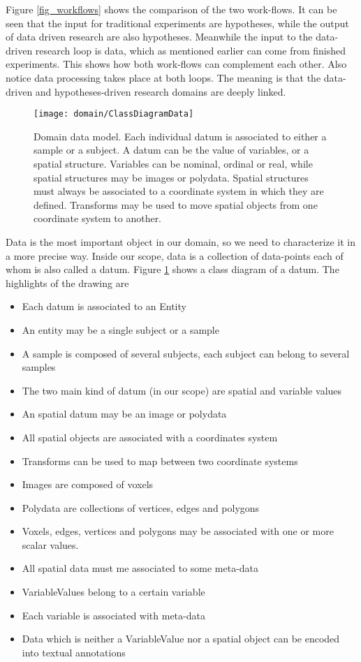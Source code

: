 Figure \ref{fig_workflows} shows the comparison of the two work-flows. It can be seen that the input for traditional experiments are hypotheses, while the output of data driven research are also hypotheses. Meanwhile the input to the data-driven research loop is data, which as mentioned earlier can come from finished experiments. This shows how both work-flows can complement each other. Also notice data processing takes place at both loops. The meaning is that the data-driven and hypotheses-driven research domains are deeply linked.  

\begin{figure}
\centering
\texttt{[image: domain/ClassDiagramData]}
\caption{\label{fig_datum_class} Domain data model. Each individual datum is associated to either a sample or a subject. A datum can be the value of variables, or a spatial structure. Variables can be nominal, ordinal or real, while spatial structures may be images or polydata. Spatial structures must always be associated to a coordinate system in which they are defined. Transforms may be used to move spatial objects from one coordinate system to another.}
\end{figure}

Data is the most important object in our domain, so we need to characterize it in a more precise way. Inside our scope, data is a collection of data-points each of whom is also called a datum. Figure \ref{fig_datum_class} shows a class diagram of a datum. The highlights of the drawing are


\begin{itemize}
\item Each datum is associated to an Entity
\item An entity may be a single subject or a sample
\item A sample is composed of several subjects, each subject can belong to several samples
\item The two main kind of datum (in our scope) are spatial and variable values
\item An spatial datum may be an image or polydata
\item All spatial objects are associated with a coordinates system
\item Transforms can be used to map between two coordinate systems
\item Images are composed of voxels
\item Polydata are collections of vertices, edges and polygons
\item Voxels, edges, vertices and polygons may be associated with one or more scalar values.
\item All spatial data must me associated to some meta-data
\item VariableValues belong to a certain variable
\item Each variable is associated with meta-data  
\item Data which is neither a VariableValue nor a spatial object can be encoded into textual annotations
\end{itemize} 

